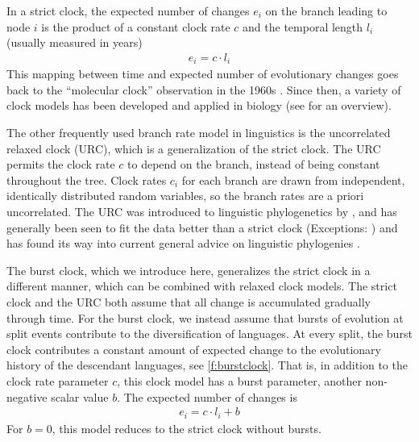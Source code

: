 \documentclass[]{rsos}%
\begin{document}
In a strict clock,
the expected number of changes $e_i$ on the branch leading to node $i$ is the product of a constant clock rate $c$ and the temporal length $l_i$ (usually measured in years)
\begin{align}
  e_i = c \cdot l_i
  \label{eq:strict}
\end{align}
This mapping between time and expected number of evolutionary changes goes back
to the “molecular clock” observation in the 1960s
\parencite{zuckerkandl1965evolutionary,kumar2005molecular}. Since then, a variety of clock models
has been developed and applied in biology (see \parencite{ho2014molecularclock} for an
overview).

The other frequently used branch rate model in linguistics is the uncorrelated relaxed
clock (URC), which is a generalization of the strict clock.
The URC \parencite{drummond2006relaxed} permits the clock rate $c$ to depend on
the branch, instead of being constant throughout the tree. Clock
rates $c_i$ for each branch are drawn from independent, identically distributed random
variables, so the branch rates are a priori uncorrelated.
The URC was introduced to linguistic
phylogenetics by \textcite{kitchen2009bayesian}, and has generally been seen to
fit the data better than a strict clock
\parencite{bouckaert2012mapping,honkola2013cultural,lee2013evolution}
(Exceptions: \cite{savelyev2020bayesian,kaiping2021systematic})
and has found its way into current general advice on linguistic phylogenies
\parencite{maurits2017beastling,hoffmann2021bayesian}.

The burst clock, which we introduce here, generalizes the strict clock in a different manner, which can be combined with relaxed clock models.
The strict clock and the URC both assume that all change is accumulated gradually
through time.
For the burst clock, we instead assume that bursts of evolution at split events
contribute to the diversification of languages.
At every split, the burst clock contributes a
constant amount of expected change to the evolutionary history of the
descendant languages, see \cref{f:burstclock}. That is, in addition to the clock rate parameter $c$, this clock model
has a burst parameter, another non-negative scalar value $b$.
The expected number of changes is
\begin{align}
  e_i = c \cdot l_i + b
  \label{eq:simple-burst}
\end{align}
For $b=0$, this model reduces to the strict clock without bursts.
\end{document}
